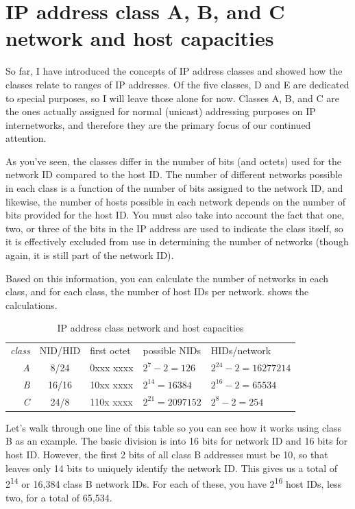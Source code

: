 \section{IP address class A, B, and C network and host capacities}

So far, I have introduced the concepts of IP address classes and showed
how the classes relate to ranges of IP addresses. Of the five classes, D
and E are dedicated to special purposes, so I will leave those alone for
now. Classes A, B, and C are the ones actually assigned for normal
(unicast) addressing purposes on IP internetworks, and therefore they
are the primary focus of our continued attention.

As you've seen, the classes differ in the number of bits (and octets)
used for the network ID compared to the host ID. The number of different
networks possible in each class is a function of the number of bits
assigned to the network ID, and likewise, the number of hosts possible
in each network depends on the number of bits provided for the host ID.
You must also take into account the fact that one, two, or three of the
bits in the IP address are used to indicate the class itself, so it is
effectively excluded from use in determining the number of networks
(though again, it is still part of the network ID).

Based on this information, you can calculate the number of networks in each class, and for each class, the number of host IDs per network.
 shows the calculations.

\begin{table}
   \centering
   \begin{tabular}{rclll}
   \textit{class} & NID/HID & first octet & possible NIDs      & HIDs/network            \\[.75ex]
   \textit{A}     & 8/24    & 0xxx xxxx   & $2^7-2 = 126$      & $2^{24}-2 = 16277214$   \\
   \textit{B}     & 16/16   & 10xx xxxx   & $2^{14} = 16384$   & $2^{16}-2 = 65534$      \\
   \textit{C}     & 24/8    & 110x xxxx   & $2^{21} = 2097152$ & $2^{8}-2 = 254$         \\
   \end{tabular}
   \caption{IP address class network and host capacities}
   \label{tab:ip-class-capacities}
\end{table}

Let's walk through one line of this table so you can see how it works using class B as an example.
The basic division is into 16 bits for network ID and 16 bits for host ID. However, the first 2 bits of all
class B addresses must be 10, so that leaves only 14 bits to uniquely identify the network ID.
This gives us a total of 2\textsuperscript{14} or 16,384 class B network IDs. For each of these, you have
2\textsuperscript{16} host IDs, less two, for a total of 65,534.

